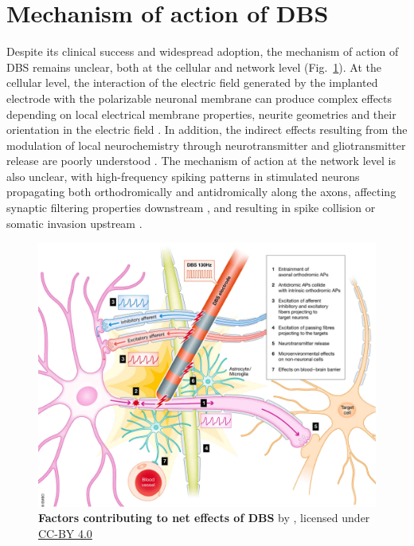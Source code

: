 %
%
%
\section{Mechanism of action of DBS}
\label{sec:ch2-dbs-mechanisms}
%
%
%
%
%
%
%
%
%
%
%

%
%
%
Despite its clinical success and widespread adoption, the mechanism of action of DBS
remains unclear, both at the cellular and network level (Fig.~\ref{fig:dbs-local-effects}).
At the cellular level, the interaction of the electric field generated by the implanted
electrode with the polarizable neuronal membrane can produce complex effects depending on
local electrical membrane properties, neurite geometries and their orientation in the electric field \cite{ranck_which_1975,nowak_axons_1998,johnson_quantifying_2008,yousif_evaluating_2010}.
%
In addition, the indirect effects resulting from the modulation of local
neurochemistry through neurotransmitter and gliotransmitter release are
poorly understood \cite{mcintyre_deep_2016}.
The mechanism of action at the network level is also unclear, with high-frequency
spiking patterns in stimulated neurons propagating both orthodromically and
antidromically \cite{li_resonant_2007} along the axons, affecting synaptic filtering
properties downstream  \cite{rosenbaum_axonal_2014}, and resulting in spike collision
or somatic invasion upstream \cite{li_therapeutic_2012,kang_effects_2014}.

%
\begin{figure}[h]
\centering
\includegraphics[width=\textwidth]{ch_background_literature/figs/JakobsLozano2018_CellularEffectsDBS_50pc.jpg}
\caption{
\textbf{Factors contributing to net effects of DBS} by \cite{jakobs_cellular_2019}, licensed under \href{https://creativecommons.org/licenses/by/4.0/}{CC-BY 4.0}}
\label{fig:dbs-local-effects}
\end{figure}

